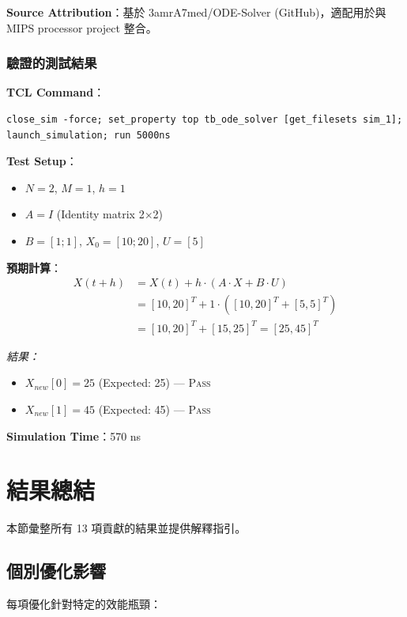 \documentclass[journal]{IEEEtran}
\newcommand{\tagit}[1]{\textit{#1}}
\newcommand{\ResultTag}{\tagit{結果：}}
\newcommand{\PASS}{\textsc{Pass}}
\begin{document}
\textbf{Source Attribution}：基於 3amrA7med/ODE-Solver (GitHub)，適配用於與 MIPS processor project 整合。

\subsubsection{驗證的測試結果}
\textbf{TCL Command}：
\begin{lstlisting}
close_sim -force; set_property top tb_ode_solver [get_filesets sim_1]; launch_simulation; run 5000ns
\end{lstlisting}

\textbf{Test Setup}：
\begin{itemize}
    \item $N = 2$, $M = 1$, $h = 1$
    \item $A = I$ (Identity matrix 2$\times$2)
    \item $B = [1; 1]$, $X_0 = [10; 20]$, $U = [5]$
\end{itemize}

\textbf{預期計算}：
\begin{align*}
X(t+h) &= X(t) + h \cdot (A \cdot X + B \cdot U) \\
       &= [10, 20]^T + 1 \cdot ([10, 20]^T + [5, 5]^T) \\
       &= [10, 20]^T + [15, 25]^T = [25, 45]^T
\end{align*}

\ResultTag
\begin{itemize}
    \item $X_{new}[0] = 25$ (Expected: 25) --- \PASS
    \item $X_{new}[1] = 45$ (Expected: 45) --- \PASS
\end{itemize}

\textbf{Simulation Time}：570 ns

\section{結果總結}

本節彙整所有 13 項貢獻的結果並提供解釋指引。

\subsection{個別優化影響}
每項優化針對特定的效能瓶頸：
\end{document}
